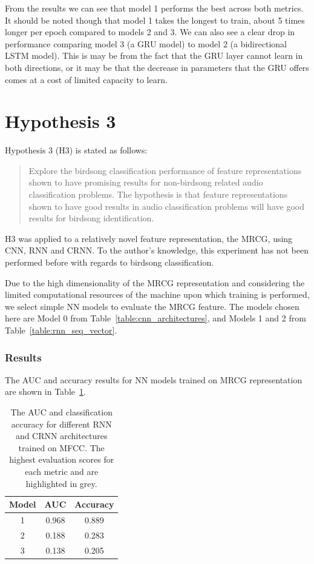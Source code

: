 From the results we can see that model 1 performs the best across both metrics.
It should be noted though that model 1 takes the longest to train, about 5 times
longer per epoch compared to models 2 and 3. We can also see a clear drop in
performance comparing model 3 (a GRU model) to model 2 (a bidirectional LSTM
model). This is may be from the fact that the GRU layer cannot learn in both
directions, or it may be that the decrease in parameters that the GRU offers
comes at a cost of limited capacity to learn.

\section{Hypothesis 3}

Hypothesis 3 (H3) is stated as follows:

\begin{quote}
Explore the birdsong classification performance of feature representations
\\shown to have promising results for non-birdsong related audio classification
problems. The hypothesis is that feature representations shown to have good
results in audio classification problems will have good results for birdsong
identification.
\end{quote}

H3 was applied to a relatively novel feature representation, the MRCG, using
CNN, RNN and CRNN\@. To the author's knowledge, this experiment has not been
performed before with regards to birdsong classification.

Due to the high dimensionality of the MRCG representation and considering the
limited computational resources of the machine upon which training is performed,
we select simple NN models to evaluate the MRCG feature. The models chosen here
are Model 0 from Table~\ref{table:cnn_architectures}, and Models 1 and 2 from
Table~\ref{table:rnn_seq_vector}.

\subsubsection{Results}

The AUC and accuracy results for NN models trained on MRCG representation are
shown in Table~\ref{table:rnn_mrcg_results}.

\begin{table}[h!t]
\begin{center}
\begin{tabular}{c c c}
\toprule
Model & AUC & Accuracy \\ [0.5ex]
\midrule
1 & \cellcolor{lightgray} 0.968 & \cellcolor{lightgray} 0.889 \\
2 & 0.188 & 0.283 \\
3 & 0.138 & 0.205 \\
\bottomrule
\end{tabular}
\caption{The AUC and classification accuracy for different RNN and CRNN
architectures trained on MFCC\@. The highest evaluation scores for each metric
and are highlighted in grey.}\label{table:rnn_mrcg_results}
\end{center}
\end{table}


